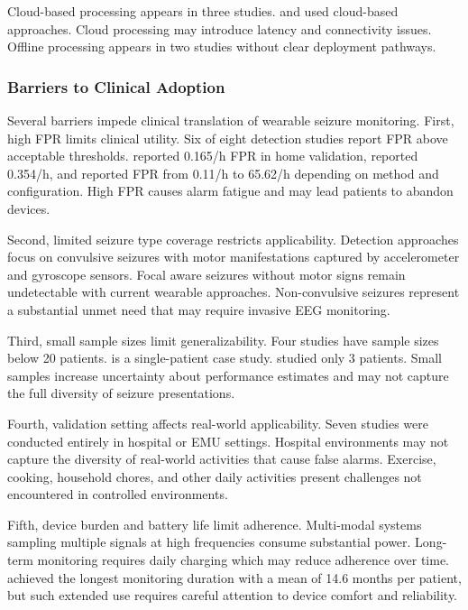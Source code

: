 Cloud-based processing appears in three studies. \textcite{nasseriAmbulatorySeizureForecasting2021} and \textcite{odeDevelopmentEpilepticSeizure2023} used cloud-based approaches. Cloud processing may introduce latency and connectivity issues. Offline processing appears in two studies without clear deployment pathways.

\subsubsection{Barriers to Clinical Adoption}

Several barriers impede clinical translation of wearable seizure monitoring. First, high FPR limits clinical utility. Six of eight detection studies report FPR above acceptable thresholds. \textcite{dongTwoLayerEnsembleMethod2022} reported 0.165/h FPR in home validation, \textcite{wangEpilepticSeizureDetection2025} reported 0.354/h, and \textcite{reintjesECGBasedDetectionEpileptic2025} reported FPR from 0.11/h to 65.62/h depending on method and configuration. High FPR causes alarm fatigue and may lead patients to abandon devices.

Second, limited seizure type coverage restricts applicability. Detection approaches focus on convulsive seizures with motor manifestations captured by accelerometer and gyroscope sensors. Focal aware seizures without motor signs remain undetectable with current wearable approaches. Non-convulsive seizures represent a substantial unmet need that may require invasive EEG monitoring.

Third, small sample sizes limit generalizability. Four studies have sample sizes below 20 patients. \textcite{singhrathoreDevelopmentMultimodalMachine2024} is a single-patient case study. \textcite{borujenyDetectionEpilepticSeizure2013} studied only 3 patients. Small samples increase uncertainty about performance estimates and may not capture the full diversity of seizure presentations.

Fourth, validation setting affects real-world applicability. Seven studies were conducted entirely in hospital or EMU settings. Hospital environments may not capture the diversity of real-world activities that cause false alarms. Exercise, cooking, household chores, and other daily activities present challenges not encountered in controlled environments.

Fifth, device burden and battery life limit adherence. Multi-modal systems sampling multiple signals at high frequencies consume substantial power. Long-term monitoring requires daily charging which may reduce adherence over time. \textcite{stirlingForecastingSeizureLikelihood2021} achieved the longest monitoring duration with a mean of 14.6 months per patient, but such extended use requires careful attention to device comfort and reliability.

